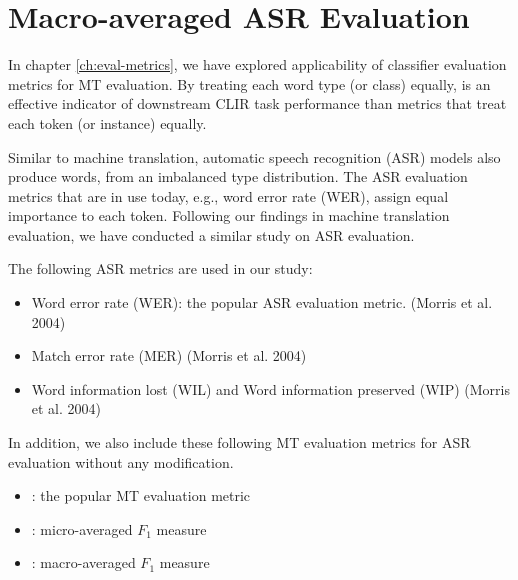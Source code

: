\chapter{Macro-averaged ASR Evaluation}

In chapter \ref{ch:eval-metrics}, we have explored applicability of classifier evaluation metrics for MT evaluation. 
By treating each word type (or class) equally,  is an effective indicator of downstream CLIR task performance than metrics that treat each token (or instance) equally.

Similar to machine translation, automatic speech recognition (ASR) models also produce words, from an imbalanced type distribution.
The ASR evaluation metrics that are in use today, e.g., word error rate (WER), assign equal importance to each token. 
Following our findings in machine translation evaluation, we have conducted a similar study on ASR evaluation.
 
The following ASR metrics are used in our study:
\begin{itemize}
\item Word error rate (WER):  the popular ASR evaluation metric. (Morris et al. 2004)
\item Match error rate (MER) (Morris et al. 2004)
\item Word information lost (WIL) and Word information preserved (WIP) (Morris et al. 2004)
\end{itemize}


In addition, we also include these following MT evaluation metrics for ASR evaluation without any modification.
\begin{itemize}
\item \bleu: the popular MT evaluation metric \cite{papineni-etal-2002-bleu}
\item {} : micro-averaged $F_1$ measure \cite{gowda2021macroaverage}
\item {} : macro-averaged $F_1$ measure \cite{gowda2021macroaverage}
\end{itemize}



